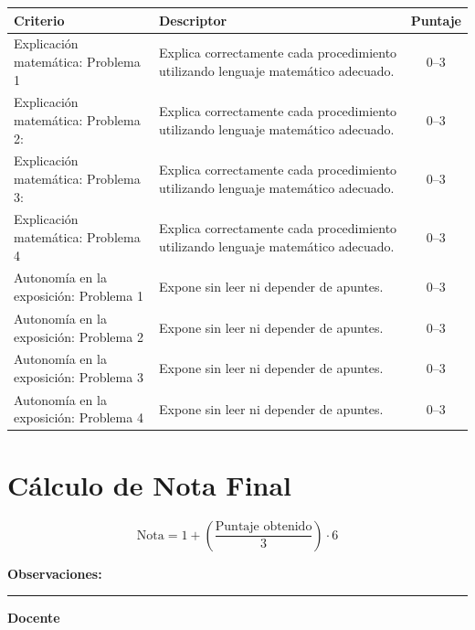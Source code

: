 \documentclass[12pt]{article}
\begin{document}
	\begin{center}
		\begin{tabular}{p{5cm} p{8cm} c}
			\toprule
			\textbf{Criterio} & \textbf{Descriptor} & \textbf{Puntaje} \\
			\midrule
			Explicación matemática: Problema 1 & Explica correctamente cada procedimiento utilizando lenguaje matemático adecuado. & 0--3 \\
			
			
			\midrule
			Explicación matemática: Problema 2: & Explica correctamente cada procedimiento utilizando lenguaje matemático adecuado. & 0--3 \\
			
			\midrule
			Explicación matemática: Problema 3: & Explica correctamente cada procedimiento utilizando lenguaje matemático adecuado. & 0--3 \\
			
			\midrule
			Explicación matemática: Problema 4 & Explica correctamente cada procedimiento utilizando lenguaje matemático adecuado. & 0--3 \\
			
			\midrule
			Autonomía en la exposición: Problema 1 & Expone sin leer ni depender de apuntes. & 0--3 \\
			
			\midrule
			Autonomía en la exposición: Problema 2 & Expone sin leer ni depender de apuntes. & 0--3 \\
				
			\midrule
			Autonomía en la exposición: Problema 3 & Expone sin leer ni depender de apuntes. & 0--3 \\
					
			\midrule
			Autonomía en la exposición: Problema 4 & Expone sin leer ni depender de apuntes. & 0--3 \\
			\bottomrule
		\end{tabular}
	\end{center}
	
	\section*{Cálculo de Nota Final}
	
	\[
	\text{Nota} = 1 + \left(\frac{\text{Puntaje obtenido}}{3}\right)\cdot 6
	\]
	
	\vspace{0.8cm}
	
	\noindent
	\textbf{Observaciones:}
	
	\vspace{2.5cm}
	
	\noindent\rule{7cm}{0.4pt}
	
	\noindent\textbf{Docente}
	
\end{document}
